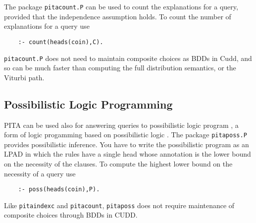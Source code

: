 The package \texttt{pitacount.P} can be used to count the explanations
for a query, provided that the independence assumption holds. To count
the number of explanations for a query use
\begin{verbatim}
    :- count(heads(coin),C).
\end{verbatim}
\texttt{pitacount.P} does not need to maintain composite choices as
BDDs in Cudd, and so can be much faster than computing the full
distribution semantics, or the Viturbi path.

\subsection{Possibilistic Logic Programming}
PITA can be used also for answering queries to possibilistic logic
program \cite{DBLP:conf/iclp/DuboisLP91}, a form of logic progamming
based on possibilistic logic \cite{DubLanPra-poss-94}. The package
\texttt{pitaposs.P} provides possibilistic inference.  You have to
write the possibilistic program as an LPAD in which the rules have a
single head whose annotation is the lower bound on the necessity of
the clauses. To compute the highest lower bound on the necessity of a
query use
\begin{verbatim}
    :- poss(heads(coin),P).
\end{verbatim}
Like {\tt pitaindexc} and {\tt pitacount}, {\tt pitaposs} does not
require maintenance of composite choices through BDDs in CUDD.
